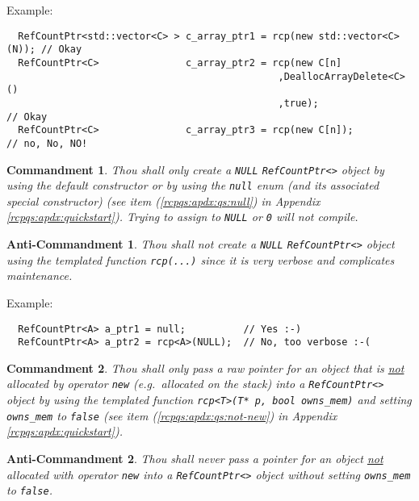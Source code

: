 \documentclass[pdf,ps2pdf,11pt]{SANDreport}
\newtheorem{commandment}{Commandment}
\newtheorem{anticommandment}{Anti-Commandment}
\begin{document}
{}\noindent{}Example:
{\small\begin{verbatim}
  RefCountPtr<std::vector<C> > c_array_ptr1 = rcp(new std::vector<C>(N)); // Okay
  RefCountPtr<C>               c_array_ptr2 = rcp(new C[n]
                                               ,DeallocArrayDelete<C>()
                                               ,true);                    // Okay
  RefCountPtr<C>               c_array_ptr3 = rcp(new C[n]);              // no, No, NO!
\end{verbatim}}

\begin{commandment}
Thou shall only create a {}\texttt{NULL} {}\texttt{Ref\-Count\-Ptr<>}
object by using the default constructor or by using the
{}\texttt{null} enum (and its associated special constructor) (see
item ({}\ref{rcpqs:apdx:qs:null}) in Appendix
{}\ref{rcpqs:apdx:quickstart}).  Trying to assign to {}\texttt{NULL}
or {}\texttt{0} will not compile.
\end{commandment}

\begin{anticommandment}
Thou shall not create a {}\texttt{NULL} {}\texttt{Ref\-Count\-Ptr<>}
object using the templated function {}\texttt{rcp(...)} since it is
very verbose and complicates maintenance.
\end{anticommandment}

{}\noindent{}Example:
{\small\begin{verbatim}
  RefCountPtr<A> a_ptr1 = null;          // Yes :-)
  RefCountPtr<A> a_ptr2 = rcp<A>(NULL);  // No, too verbose :-(
\end{verbatim}}

\begin{commandment}
Thou shall only pass a raw pointer for an object that is
{}\underline{not} allocated by operator {}\texttt{new} (e.g.~allocated
on the stack) into a {}\texttt{Ref\-Count\-Ptr<>} object by using the
templated function {}\texttt{rcp<T>(T* p, bool owns\_mem)} and setting
{}\texttt{owns\_mem} to {}\texttt{false} (see item
({}\ref{rcpqs:apdx:qs:not-new}) in Appendix
{}\ref{rcpqs:apdx:quickstart}).
\end{commandment}

\begin{anticommandment}
Thou shall never pass a pointer for an object {}\underline{not}
allocated with operator {}\texttt{new} into a
{}\texttt{Ref\-Count\-Ptr<>} object without setting
{}\texttt{owns\_mem} to {}\texttt{false}.
\end{anticommandment}
\end{document}
